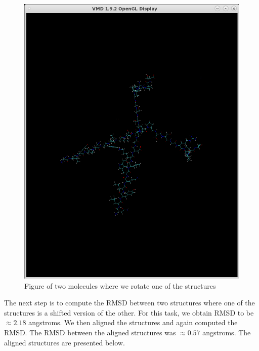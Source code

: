 \documentclass[11pt]{article}
\makeatletter
\def\maxwidth{\ifdim\Gin@nat@width>\linewidth\linewidth
    \else\Gin@nat@width\fi}
\let\Oldincludegraphics\includegraphics
\renewcommand{\includegraphics}[1]{\Oldincludegraphics[width=.8\maxwidth]{#1}}
\makeatother
\begin{document}
\begin{figure}
\centering
\includegraphics{Screenshot_rotate_one.png}
\caption{Figure of two molecules where we rotate one of the structures}
\end{figure}

The next step is to compute the RMSD between two structures where one of
the structures is a shifted version of the other. For this task, we
obtain RMSD to be \(\approx 2.18\) angstroms. We then aligned the
structures and again computed the RMSD. The RMSD between the aligned
structures was \(\approx 0.57\) angstroms. The aligned structures are
presented below.
\end{document}
